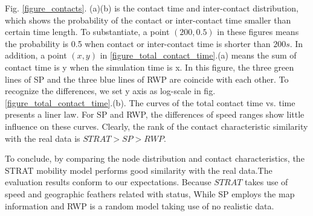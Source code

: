 Fig. \ref{figure_contacts}. (a)(b) is the contact time and inter-contact distribution, which shows the probability of the contact or inter-contact time smaller than certain time length. To substantiate, a point $(200,0.5)$ in these figures means the probability is 0.5 when contact or inter-contact time is shorter than $200s$. In addition, a point $(x,y)$ in \ref{figure_total_contact_time}.(a) means the sum of contact time is y when the simulation time is x. In this figure, the three green lines of SP and the three blue lines of RWP are coincide with each other. To recognize the differences, we set y axis as log-scale in fig.\ref{figure_total_contact_time}.(b).
The curves of the total contact time vs. time presents a liner law. For SP and RWP, the differences of speed ranges show little influence on these curves.
Clearly, the rank of the contact characteristic similarity with the real data is $STRAT>SP>RWP$.

To conclude, by comparing the node distribution and contact characteristics, the STRAT mobility model performs good similarity with the real data.The evaluation results conform to our expectations. Because $STRAT$ takes use of speed and geographic feathers related with status, While SP employs the map information and RWP is a random model taking use of no realistic data.

